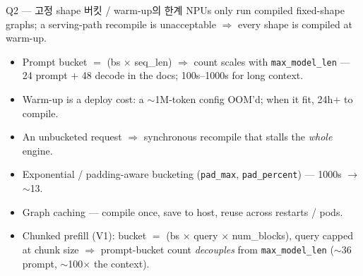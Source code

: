\begin{frame}{Q2 — 고정 shape 버킷 / warm-up의 한계}
  NPUs only run compiled fixed-shape graphs; a serving-path recompile is unacceptable
  $\Rightarrow$ every shape is compiled at warm-up.

  \begin{itemize}
    \item Prompt bucket $=$ (bs $\times$ seq\_len) $\Rightarrow$ count scales with \texttt{max\_model\_len}
          — 24 prompt $+$ 48 decode in the docs; 100s--1000s for long context.
    \item Warm-up is a deploy cost: a $\sim$1M-token config OOM'd; when it fit, 24h$+$ to compile.
    \item An unbucketed request $\Rightarrow$ synchronous recompile that stalls the \emph{whole} engine.
  \end{itemize}

  \begin{itemize}
    \item Exponential / padding-aware bucketing (\texttt{pad\_max}, \texttt{pad\_percent}) — 1000s $\to$ $\sim$13.
    \item Graph caching — compile once, save to host, reuse across restarts / pods.
    \item Chunked prefill (V1): bucket $=$ (bs $\times$ query $\times$ num\_blocks), query capped at chunk size
          $\Rightarrow$ prompt-bucket count \emph{decouples} from \texttt{max\_model\_len}
          ($\sim$36 prompt, $\sim$100$\times$ the context).
  \end{itemize}
\end{frame}
